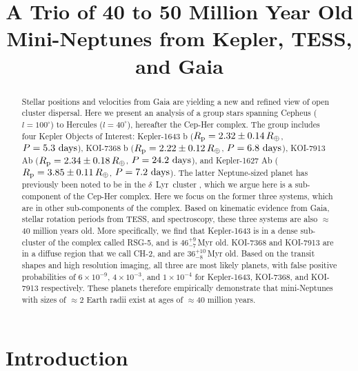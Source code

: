 \documentclass[12pt,twocolumn,linenumbers]{aastex63}
\begin{document}
\title{
  A Trio of 40 to 50 Million Year Old Mini-Neptunes from Kepler, TESS, and Gaia
}



\begin{abstract}
  Stellar positions and velocities from Gaia are yielding a new and
  refined view of open cluster dispersal.
  Here we present an analysis of a group stars spanning Cepheus
  ($l=100^\circ$) to Hercules ($l=40^\circ$), hereafter the Cep-Her
  complex.
  The group includes four Kepler Objects of Interest:
  Kepler-1643 b ($R_{\rm p} = 2.32 \pm 0.14\,R_\oplus$, $P = 5.3\ {\rm days}$),
  KOI-7368 b ($R_{\rm p} = 2.22 \pm 0.12\,R_\oplus$, $P = 6.8\ {\rm days}$), 
  KOI-7913 Ab ($R_{\rm p} = 2.34 \pm 0.18\,R_\oplus$, $P = 24.2\ {\rm days}$), and
  Kepler-1627 Ab ($R_{\rm p} = 3.85 \pm 0.11\,R_\oplus$, $P = 7.2\ {\rm days}$).
  The latter Neptune-sized planet has previously been noted to be in
  the $\delta$\ Lyr\ cluster \citep{bouma_kep1627_2022}, which we
  argue here is a sub-component of the Cep-Her complex.
  Here we focus on the former three systems, which are in other
  sub-components of the complex.
  Based on kinematic evidence from Gaia, stellar rotation periods from
  TESS, and spectroscopy, these three systems are also $\approx$40
  million years old.
  More specifically, we find that Kepler-1643 is in a dense
  sub-cluster of the complex called RSG-5, and is $46^{+9}_{-7}$\,Myr old.
  KOI-7368 and KOI-7913 are in a diffuse region that we call
  CH-2, and are $36^{+10}_{-8}$\,Myr old.
  Based on the transit shapes and high resolution imaging, all three are
  most likely planets, with false positive probabilities of
  $6\times10^{-9}$, $4\times10^{-3}$, and $1\times10^{-4}$ for
  Kepler-1643, KOI-7368, and KOI-7913 respectively.
  These planets therefore empirically
  demonstrate that mini-Neptunes with sizes of $\approx$2 Earth
  radii exist at ages of $\approx$40 million years.
\end{abstract}





\section{Introduction}
\end{document}

